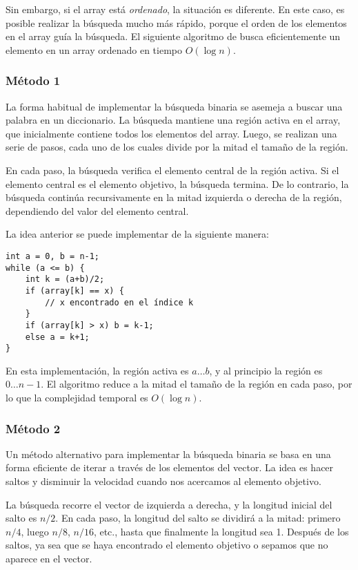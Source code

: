 Sin embargo, si el array está \emph{ordenado},
la situación es diferente.
En este caso, es posible realizar la
búsqueda mucho más rápido, porque el orden de los
elementos en el array guía la búsqueda.
El siguiente algoritmo de 
busca eficientemente un elemento en un array ordenado
en tiempo $O(\log n)$.

\subsubsection{Método 1}

La forma habitual de implementar la búsqueda binaria
se asemeja a buscar una palabra en un diccionario.
La búsqueda mantiene una región activa en el array,
que inicialmente contiene todos los elementos del array.
Luego, se realizan una serie de pasos,
cada uno de los cuales divide por la mitad el tamaño de la región.

En cada paso, la búsqueda verifica el elemento central
de la región activa.
Si el elemento central es el elemento objetivo,
la búsqueda termina.
De lo contrario, la búsqueda continúa recursivamente
en la mitad izquierda o derecha de la región,
dependiendo del valor del elemento central.

La idea anterior se puede implementar de la siguiente manera:
\begin{lstlisting}
int a = 0, b = n-1;
while (a <= b) {
    int k = (a+b)/2;
    if (array[k] == x) {
        // x encontrado en el índice k
    }
    if (array[k] > x) b = k-1;
    else a = k+1;
}
\end{lstlisting}

En esta implementación, la región activa es $a \ldots b$,
y al principio la región es $0 \ldots n-1$.
El algoritmo reduce a la mitad el tamaño de la región en cada paso,
por lo que la complejidad temporal es $O(\log n)$.

\subsubsection{Método 2}

Un método alternativo para implementar la búsqueda binaria
se basa en una forma eficiente de iterar a través de
los elementos del vector.
La idea es hacer saltos y disminuir la velocidad
cuando nos acercamos al elemento objetivo.

La búsqueda recorre el vector de izquierda a
derecha, y la longitud inicial del salto es $n/2$.
En cada paso, la longitud del salto se dividirá a la mitad:
primero $n/4$, luego $n/8$, $n/16$, etc., hasta
que finalmente la longitud sea 1.
Después de los saltos, ya sea que se haya encontrado el elemento objetivo o sepamos que no aparece en el vector.

